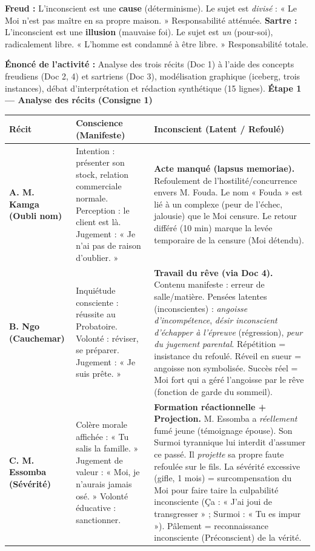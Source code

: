 \documentclass[11pt]{article}
\newcounter{popsec}
\newcounter{popsub}
\newcommand{\courssub}[1]{%
  \stepcounter{popsub}%
  \par\vspace{9pt}\noindent{\popxbold\fontsize{11.5}{13}\selectfont\color{popink}{\color{poporange}\thepopsec.\thepopsub}\hspace{6pt}#1}\par\nopagebreak\vspace{4pt}
}
\begin{document}
\begin{aretenir}
\textbf{Freud :} L'inconscient est une \textbf{cause} (déterminisme). Le sujet est \emph{divisé} : « Le Moi n'est pas maître en sa propre maison. » Responsabilité atténuée.
\textbf{Sartre :} L'inconscient est une \textbf{illusion} (mauvaise foi). Le sujet est \emph{un} (pour-soi), radicalement libre. « L'homme est condamné à être libre. » Responsabilité totale.
\end{aretenir}

\courssub{Démarche et corrigé commenté}
\begin{exoresolu}
\textbf{Énoncé de l'activité :} Analyse des trois récits (Doc 1) à l'aide des concepts freudiens (Doc 2, 4) et sartriens (Doc 3), modélisation graphique (iceberg, trois instances), débat d'interprétation et rédaction synthétique (15 lignes).
\tcblower
\textbf{Étape 1 — Analyse des récits (Consigne 1)}

\begin{center}
\begin{tabularx}{\linewidth}{|l|X|X|}\hline
\textbf{Récit} & \textbf{Conscience (Manifeste)} & \textbf{Inconscient (Latent / Refoulé)} \\ \hline
\textbf{A. M. Kamga (Oubli nom)} & Intention : présenter son stock, relation commerciale normale. Perception : le client est là. Jugement : « Je n'ai pas de raison d'oublier. » & \textbf{Acte manqué (lapsus memoriae).} Refoulement de l'hostilité/concurrence envers M. Fouda. Le nom « Fouda » est lié à un complexe (peur de l'échec, jalousie) que le Moi censure. Le retour différé (10 min) marque la levée temporaire de la censure (Moi détendu). \\ \hline
\textbf{B. Ngo (Cauchemar)} & Inquiétude consciente : réussite au Probatoire. Volonté : réviser, se préparer. Jugement : « Je suis prête. » & \textbf{Travail du rêve (via Doc 4).} Contenu manifeste : erreur de salle/matière. Pensées latentes (inconscientes) : \emph{angoisse d'incompétence}, \emph{désir inconscient d'échapper à l'épreuve} (régression), \emph{peur du jugement parental}. Répétition = insistance du refoulé. Réveil en sueur = angoisse non symbolisée. Succès réel = Moi fort qui a géré l'angoisse par le rêve (fonction de garde du sommeil). \\ \hline
\textbf{C. M. Essomba (Sévérité)} & Colère morale affichée : « Tu salis la famille. » Jugement de valeur : « Moi, je n'aurais jamais osé. » Volonté éducative : sanctionner. & \textbf{Formation réactionnelle + Projection.} M. Essomba a \emph{réellement} fumé jeune (témoignage épouse). Son Surmoi tyrannique lui interdit d'assumer ce passé. Il \emph{projette} sa propre faute refoulée sur le fils. La sévérité excessive (gifle, 1 mois) = surcompensation du Moi pour faire taire la culpabilité inconsciente (Ça : « J'ai joui de transgresser » ; Surmoi : « Tu es impur »). Pâlement = reconnaissance inconsciente (Préconscient) de la vérité. \\ \hline
\end{tabularx}
\end{center}


\end{exoresolu}
\end{document}
